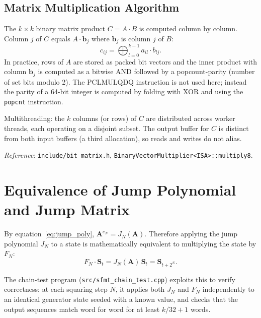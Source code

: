 \documentclass{article}
\begin{document}
\subsection{Matrix Multiplication Algorithm}

The $k \times k$ binary matrix product $C = A \cdot B$ is computed column by column.
Column $j$ of $C$ equals $A \cdot \mathbf{b}_j$ where $\mathbf{b}_j$ is column $j$ of $B$:
\begin{equation}
  c_{ij} = \bigoplus_{l=0}^{k-1} a_{il} \cdot b_{lj}.
\end{equation}
In practice, rows of $A$ are stored as packed bit vectors and the inner product with column
$\mathbf{b}_j$ is computed as a bitwise AND followed by a popcount-parity (number of set
bits modulo 2).  The PCLMULQDQ instruction is not used here; instead the parity of a 64-bit
integer is computed by folding with XOR and using the \texttt{popcnt} instruction.

Multithreading: the $k$ columns (or rows) of $C$ are distributed across worker threads,
each operating on a disjoint subset.  The output buffer for $C$ is distinct from both input
buffers (a third allocation), so reads and writes do not alias.

\noindent\textit{Reference}: \texttt{include/bit\_matrix.h},
\texttt{BinaryVectorMultiplier<ISA>::multiply8}.

\section{Equivalence of Jump Polynomial and Jump Matrix}
\label{sec:equivalence}

By equation~\eqref{eq:jump_poly}, $\mathbf{A}^{e_N} = J_N(\mathbf{A})$.  Therefore
applying the jump polynomial $J_N$ to a state is mathematically equivalent to multiplying
the state by $F_N$:
\begin{equation}
  F_N \cdot \mathbf{S}_t = J_N(\mathbf{A})\,\mathbf{S}_t = \mathbf{S}_{t+2^N}.
\end{equation}

The chain-test program (\texttt{src/sfmt\_chain\_test.cpp}) exploits this to verify
correctness: at each squaring step $N$, it applies both $J_N$ and $F_N$ independently to
an identical generator state seeded with a known value, and checks that the output sequences
match word for word for at least $k/32 + 1$ words.

\end{document}
